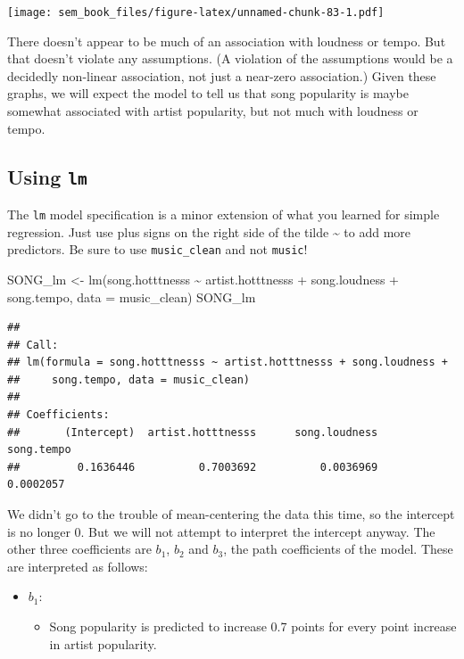 \documentclass[
]{book}
\newenvironment{Shaded}{\begin{snugshade}}{\end{snugshade}}
\newcommand{\AttributeTok}[1]{\textcolor[rgb]{0.77,0.63,0.00}{#1}}
\newcommand{\FunctionTok}[1]{\textcolor[rgb]{0.00,0.00,0.00}{#1}}
\newcommand{\NormalTok}[1]{#1}
\newcommand{\OtherTok}[1]{\textcolor[rgb]{0.56,0.35,0.01}{#1}}
\newcommand{\SpecialCharTok}[1]{\textcolor[rgb]{0.00,0.00,0.00}{#1}}
\providecommand{\tightlist}{%
  \setlength{\itemsep}{0pt}\setlength{\parskip}{0pt}}
\begin{document}
\texttt{[image: sem\_book\_files/figure-latex/unnamed-chunk-83-1.pdf]}

There doesn't appear to be much of an association with loudness or tempo. But that doesn't violate any assumptions. (A violation of the assumptions would be a decidedly non-linear association, not just a near-zero association.) Given these graphs, we will expect the model to tell us that song popularity is maybe somewhat associated with artist popularity, but not much with loudness or tempo.

\hypertarget{multiple-r-lm}{%
\subsection{\texorpdfstring{Using \texttt{lm}}{Using lm}}\label{multiple-r-lm}}

The \texttt{lm} model specification is a minor extension of what you learned for simple regression. Just use plus signs on the right side of the tilde \textasciitilde{} to add more predictors. Be sure to use \texttt{music\_clean} and not \texttt{music}!

\begin{Shaded}
\begin{Highlighting}[]
\NormalTok{SONG\_lm }\OtherTok{\textless{}{-}} \FunctionTok{lm}\NormalTok{(song.hotttnesss }\SpecialCharTok{\textasciitilde{}}\NormalTok{ artist.hotttnesss }\SpecialCharTok{+}
\NormalTok{                  song.loudness }\SpecialCharTok{+}
\NormalTok{                  song.tempo,}
              \AttributeTok{data =}\NormalTok{ music\_clean)}
\NormalTok{SONG\_lm}
\end{Highlighting}
\end{Shaded}

\begin{verbatim}
## 
## Call:
## lm(formula = song.hotttnesss ~ artist.hotttnesss + song.loudness + 
##     song.tempo, data = music_clean)
## 
## Coefficients:
##       (Intercept)  artist.hotttnesss      song.loudness         song.tempo  
##         0.1636446          0.7003692          0.0036969          0.0002057
\end{verbatim}

We didn't go to the trouble of mean-centering the data this time, so the intercept is no longer 0. But we will not attempt to interpret the intercept anyway. The other three coefficients are \(b_{1}\), \(b_{2}\) and \(b_{3}\), the path coefficients of the model. These are interpreted as follows:

\begin{itemize}
\tightlist
\item
  \(b_{1}\):

  \begin{itemize}
  \tightlist
  \item
    Song popularity is predicted to increase 0.7 points for every point increase in artist popularity.
  \end{itemize}
\end{itemize}
\end{document}
